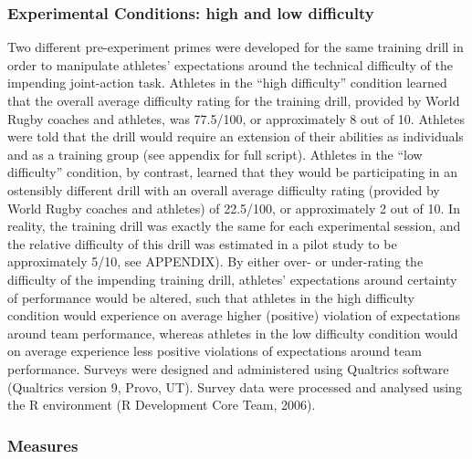 

\subsubsection{Experimental Conditions: high and low difficulty}
Two different pre-experiment primes were developed for the same training drill in order to manipulate athletes’ expectations around the technical difficulty of the impending joint-action task.  Athletes in the ``high difficulty'' condition learned that the overall average difficulty rating for the training drill, provided by World Rugby coaches and athletes, was 77.5/100, or approximately 8 out of 10.  Athletes were told that the drill would require an extension of their abilities as individuals and as a training group (see appendix for full script).  Athletes in the ``low difficulty'' condition, by contrast, learned that they would be participating in an ostensibly different drill with an overall average difficulty rating (provided by World Rugby coaches and athletes) of 22.5/100, or approximately 2 out of 10.  In reality, the training drill was exactly the same for each experimental session, and the relative difficulty of this drill was estimated in a pilot study to be approximately 5/10, see APPENDIX).  By either over- or under-rating the difficulty of the impending training drill, athletes' expectations around certainty of performance would be altered, such that athletes in the high difficulty condition would experience on average higher (positive) violation of expectations around team performance, whereas athletes in the low difficulty condition would on average experience less positive violations of expectations around team performance. Surveys were designed and administered using Qualtrics software (Qualtrics version 9, Provo, UT). Survey data were processed and analysed using the R environment (R Development Core Team, 2006).


\subsubsection{Measures}


